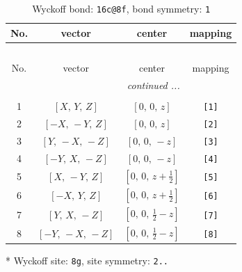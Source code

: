 \documentclass[fleqn,8pt]{jsarticle}
\begin{document}
\renewcommand{\arraystretch}{1.2}
\begin{longtable}{cccc}
\caption{Wyckoff bond: {\tt 16c@8f}, bond symmetry: {\tt 1}}
 \\
 \hline \hline
No. & vector & center & mapping \\ \hline \endfirsthead

\multicolumn{3}{l}{\tablename\ \thetable{}} \\
 \hline \hline
No. & vector & center & mapping \\ \hline \endhead

 \hline \hline
\multicolumn{3}{r}{\footnotesize\it continued ...} \\ \endfoot

 \hline \hline
\multicolumn{3}{r}{} \\ \endlastfoot

1 & $\left[ X,\, Y,\, Z \right]$ & $\left[ 0,\, 0,\, z \right]$ & {\tt [1]} \\ \hline
2 & $\left[ - X,\, - Y,\, Z \right]$ & $\left[ 0,\, 0,\, z \right]$ & {\tt [2]} \\ \hline
3 & $\left[ Y,\, - X,\, - Z \right]$ & $\left[ 0,\, 0,\, - z \right]$ & {\tt [3]} \\ \hline
4 & $\left[ - Y,\, X,\, - Z \right]$ & $\left[ 0,\, 0,\, - z \right]$ & {\tt [4]} \\ \hline
5 & $\left[ X,\, - Y,\, Z \right]$ & $\left[ 0,\, 0,\, z + \frac{1}{2} \right]$ & {\tt [5]} \\ \hline
6 & $\left[ - X,\, Y,\, Z \right]$ & $\left[ 0,\, 0,\, z + \frac{1}{2} \right]$ & {\tt [6]} \\ \hline
7 & $\left[ Y,\, X,\, - Z \right]$ & $\left[ 0,\, 0,\, \frac{1}{2} - z \right]$ & {\tt [7]} \\ \hline
8 & $\left[ - Y,\, - X,\, - Z \right]$ & $\left[ 0,\, 0,\, \frac{1}{2} - z \right]$ & {\tt [8]} \\
\end{longtable}
* Wyckoff site: {\tt 8g}, site symmetry: {\tt 2..}
\renewcommand{\arraystretch}{1.2}
\end{document}
